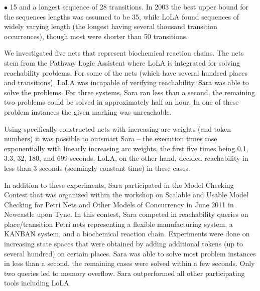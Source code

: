 \documentclass{LMCS}
\begin{document}
\begin{iteMize}{$\bullet$}
15 and a longest sequence of 28 transitions. In 2003 the best upper bound for the sequences
lengths was assumed to be 35, while LoLA found sequences of widely varying length (the longest having several thousand transition occurrences), though most
were shorter than 50 transitions.
\item We investigated five nets that represent biochemical reaction chains. The nets stem from the Pathway Logic Assistent \cite{talcottdill} where LoLA
is integrated for solving reachability problems. For some of the nets (which have several hundred places and transitions), LoLA was incapable of
verifying reachability. Sara was able to solve the problems. For three systems, Sara ran less than a second, the remaining two problems
could be solved in approximately half an hour. In one of these problem instances the given marking was unreachable.
\item Using specifically constructed nets with increasing arc weights (and token numbers) it was possible to outsmart
Sara -- the execution times rose exponentially with linearly increasing arc weights, the first five
times being 0.1, 3.3, 32, 180, and 699 seconds. LoLA, on the other hand,
decided reachability in less than 3 seconds (seemingly constant time) in these cases.
\end{iteMize}\smallskip

\noindent In addition to these experiments, Sara participated in the Model Checking Contest \cite{mcc} that was organized within the workshop on
Scalable and Usable Model Checking for Petri Nets and Other Models of Concurrency in June 2011 in Newcastle upon Tyne.
In this contest, Sara competed in reachability queries on place/transition Petri nets representing a flexible manufacturing system,
a KANBAN system, and a biochemical reaction chain. Experiments were done on increasing state spaces that were obtained by adding
additional tokens (up to several hundred) on certain places. Sara was able to solve most problem instances in less than a second, the remaining cases
were solved within a few seconds. Only two queries led to memory overflow. Sara outperformed all other participating tools including LoLA.
\end{document}
